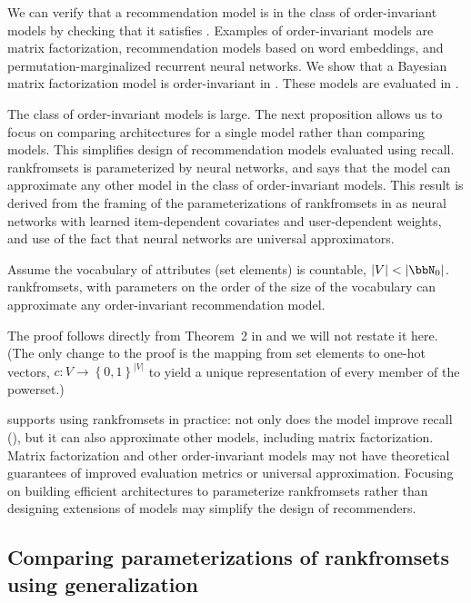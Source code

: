 We can verify that a recommendation model is in the class of order-invariant
models by checking that it satisfies . Examples of
order-invariant models are matrix factorization, recommendation models based on
word embeddings, and permutation-marginalized recurrent neural networks.
We show that a Bayesian matrix factorization model \cite{Gopalana} is
order-invariant in . These models are evaluated in
.

The class of order-invariant models is large. The next proposition allows us to
focus on comparing architectures for a single model rather than comparing
models. This simplifies design of recommendation models evaluated using recall.
\acrshort{rankfromsets} is parameterized by neural networks, and 
says that the model can approximate any other model in the class of
order-invariant models. This result is derived from the framing of the
parameterizations of \acrshort{rankfromsets} in  as
neural networks with learned item-dependent covariates and user-dependent
weights, and use of the fact that neural networks are universal approximators.

\begin{proposition}
  Assume the vocabulary of attributes (set elements) is countable,
  $\lvert V \rvert < \lvert \bbN_0 \rvert$. \acrshort{rankfromsets}, with
  parameters on the order of the size of the vocabulary can approximate any
  order-invariant recommendation model.
  \label{prop:2}
\end{proposition}
The proof follows directly from Theorem~2 in
\citet{DBLP:journals/corr/ZaheerKRPSS17} and we will not restate it here. (The
only change to the proof is the mapping from set elements to one-hot vectors,
$c \colon V \to \left\{0, 1\right\}^{\lvert V \rvert}$ to yield a unique
representation of every member of the powerset.)

 supports using \acrshort{rankfromsets} in practice: not only does
the model improve recall (), but it can also approximate other
models, including matrix factorization. Matrix factorization and other
order-invariant models may not have theoretical guarantees of improved
evaluation metrics or universal approximation. Focusing on building efficient
architectures to parameterize \acrshort{rankfromsets} rather than designing
extensions of models may simplify the design of recommenders.

\subsection{Comparing parameterizations of \acrshort{rankfromsets} using
  generalization}
\label{sec:generalization}

